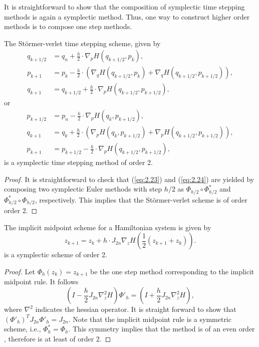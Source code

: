 It is straightforward to show that the composition of symplectic time stepping methods is again a symplectic method. Thus, one way to construct higher order methods is to compose one step methods.
\begin{theorem}
The St\"ormer-verlet time stepping scheme, given by
\begin{equation} \label{eq:2.23}
\begin{aligned}
	q_{k+1/2} &= q_n + \frac h 2 \cdot \nabla_pH(q_{k+1/2},p_k), \\
	p_{k+1} &= p_k - \frac h 2\cdot (\nabla_qH(q_{k+1/2},p_k) + \nabla_qH(q_{k+1/2},p_{k+1/2}) ), \\
	q_{k+1} &= q_{k+1/2} + \frac h 2 \cdot \nabla_pH(q_{k+1/2},p_{k+1/2}),
\end{aligned}
\end{equation}
or 
\begin{equation} \label{eq:2.24}
\begin{aligned}
	p_{k+1/2} &= p_n - \frac h 2 \cdot \nabla_pH(q_k,p_{k+1/2}), \\
	q_{k+1} &= q_k + \frac h 2\cdot (\nabla_pH(q_k,p_{k+1/2}) + \nabla_pH(q_{k+1/2},p_{k+1/2}) ), \\
	p_{k+1} &= p_{k+1/2} - \frac h 2 \cdot \nabla_pH(q_{k+1/2},p_{k+1/2}),
\end{aligned}
\end{equation}
is a symplectic time stepping method of order 2.
\end{theorem}
\begin{proof}
It is straightforward to check that (\ref{eq:2.23}) and (\ref{eq:2.24}) are yielded by composing two symplectic Euler methods with step $h/2$ as $\Phi_{h/2}\circ \Phi^*_{h/2}$ and $\Phi^*_{h/2}\circ \Phi_{h/2}$, respectively. This implies that the St\"ormer-verlet scheme is of order order 2.
\end{proof}
\begin{theorem}
The implicit midpoint scheme for a Hamiltonian system is given by
\begin{equation}
	z_{k+1} = z_k + h \cdot J_{2n} \nabla_z H( \frac{1}{2}(z_{k+1} + z_k) ).
\end{equation}
is a symplectic scheme of order 2.
\end{theorem}
\begin{proof}
Let $\Phi_h(z_k) = z_{k+1}$ be the one step method corresponding to the implicit midpoint rule. It follows 
\begin{equation*}
	(I - \frac h 2 J_{2n} \nabla^2_z H) \Phi'_h = (I + \frac{h}{2} J_{2n} \nabla^2_z H),
\end{equation*}
where $\nabla^2$ indicates the hessian operator. It is straight forward to show that $(\Phi'_h)^T J_{2n} \Phi'_h = J_{2n} $. Note that the implicit midpoint rule is a symmetric scheme, i.e., $\Phi^*_h = \Phi_h$. This symmetry implies that the method is of an even order \cite{hairer2006geometric}, therefore is at least of order 2.
\end{proof}

